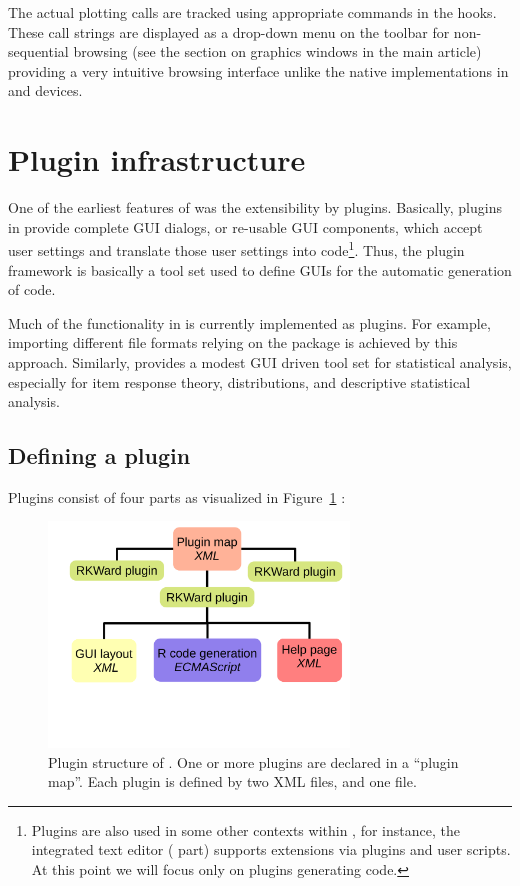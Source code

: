 The actual plotting calls are tracked using appropriate  commands in
the hooks. These call strings are displayed as a drop-down menu on the toolbar
for non-sequential browsing (see the section on graphics windows in the main article) providing a very intuitive browsing
interface unlike the native implementations in  and  devices.

\section{Plugin infrastructure}
\label{sec:technical_plugins}
One of the earliest features of  was the extensibility by plugins.
Basically, plugins in  provide complete GUI dialogs, or re-usable
GUI components, which accept user settings and translate those user settings
into  code\footnote{
    Plugins are also used in some other contexts within , for instance, the
    integrated text editor ( part) supports extensions via plugins and user scripts. At this point we
    will focus only on plugins generating  code.
}. Thus, the plugin framework is basically a tool set used to define
GUIs for the automatic generation of  code.

Much of the functionality in  is currently implemented as plugins. For example, importing different file
formats relying on the  package is achieved by this approach. Similarly,
 provides a modest GUI driven tool set for statistical analysis,
especially for item response theory, distributions, and descriptive
statistical analysis.

\subsection{Defining a plugin}
\label{sec:technical_plugins_defining}
Plugins consist of four parts as visualized in Figure~\ref{fig:plugin_structure} 
\citep[see Section~\ref{sec:example_plugin} for an example; for a complete
manual, see][]{Friedrichsmeier2010}:

\begin{figure}[t!]
 \centering
 \includegraphics[clip=true,trim=0cm 6cm 0cm 0cm,width=8cm]{./figures/plugin_structure.pdf}
 \caption{Plugin structure of . One or more plugins are declared in a ``plugin map''. Each plugin is defined by
 two XML files, and one  file.}
 \label{fig:plugin_structure}
\end{figure}

